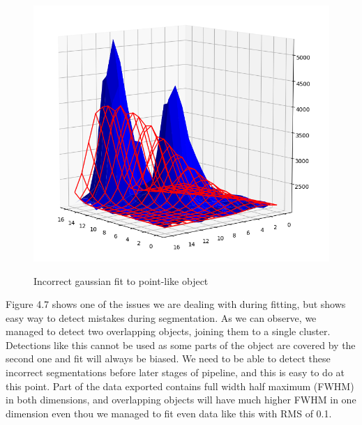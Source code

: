 \documentclass[12pt, a4paper, oneside]{book}
\begin{document}
\begin{figure}[H]
    \begin{center}
        \includegraphics[scale=2.00]{images/gauss_point_bad.png}
        \label{img:gauss_point_bad}
        \caption{Incorrect gaussian fit to point-like object}
    \end{center}
\end{figure}

Figure 4.7 shows one of the issues we are dealing with during fitting, but shows easy way to detect mistakes during segmentation.
As we can observe, we managed to detect two overlapping objects, joining them to a single cluster.
Detections like this cannot be used as some parts of the object are covered by the second one and fit will always be biased.
We need to be able to detect these incorrect segmentations before later stages of pipeline, and this is easy to do at this point.
Part of the data exported contains full width half maximum (FWHM) in both dimensions, and overlapping objects will have much higher FWHM in one dimension even thou we managed to fit even data like this with RMS of 0.1.
\end{document}
